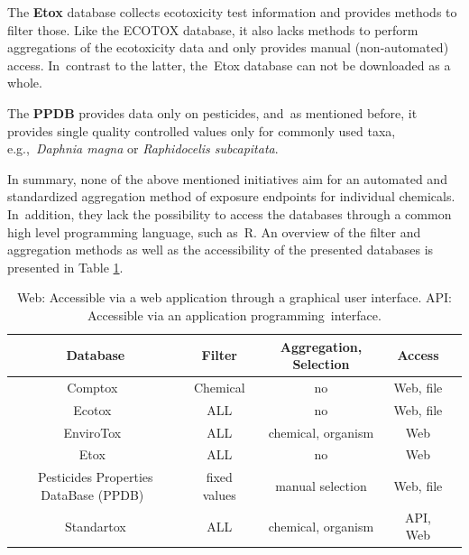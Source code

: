 \documentclass[data,datadescriptor,accept,moreauthors,pdftex]{Definitions/mdpi}
\begin{document}
\par
The \textbf{Etox} database collects ecotoxicity test information and provides methods to filter those. Like the ECOTOX database, it also lacks methods to perform aggregations of the ecotoxicity data and only provides manual (non-automated) access. In~contrast to the latter, the~Etox database can not be downloaded as a whole.
\par
The \textbf{PPDB} provides data only on pesticides, and~as mentioned before, it provides single quality controlled values only for commonly used taxa, e.g.,~\textit{Daphnia magna} or \textit{Raphidocelis subcapitata}.
\par
In summary, none of the above mentioned initiatives aim for an automated and standardized aggregation method of exposure endpoints for individual chemicals. In~addition, they lack the possibility to access the databases through a common high level programming language, such as~R. An overview of the filter and aggregation methods as well as the accessibility of the presented databases is presented in Table \ref{tab:database-differences}.

\begin{table}[H]
    \caption{ Web: Accessible via a web application through a graphical user interface. API: Accessible via an application programming~interface.} %

    \label{tab:database-differences}
    \centering
    \begin{tabular}{ccccc}
    \toprule
    \textbf{Database} & \textbf{Filter} & \textbf{Aggregation, Selection} & \textbf{Access} \\
    \midrule
    Comptox~\citep{williams_comptox_2017} & Chemical & no & Web, file \\
    Ecotox~\citep{usepa_ecotox_2019} & ALL & no & Web, file \\
    EnviroTox~\citep{healthandenvironmentalsciencesinstitutehesi_envirotox_2019} & ALL & chemical, organism & Web \\
    Etox~\citep{umweltbundesamt_etox_2019} & ALL & no & Web \\
    Pesticides Properties DataBase (PPDB)~\citep{lewis_international_2016} & fixed values & manual selection & Web, file \\
    Standartox & ALL & chemical, organism & API, Web \\
    \bottomrule
\end{tabular}
\end{table}
\end{document}

